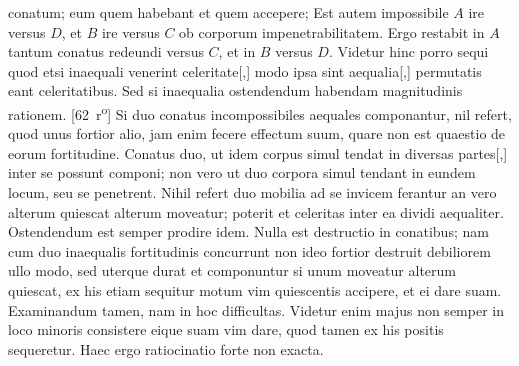  conatum;
eum quem habebant et quem accepere;
Est autem impossibile $\displaystyle A$ ire versus $\displaystyle D$,
et 
$\displaystyle B$ ire versus $\displaystyle C$ ob corporum impenetrabilitatem\protect{}. %
Ergo restabit in $\displaystyle A$ tantum conatus\protect{} redeundi versus $\displaystyle C$,
et in $\displaystyle B$ 
versus $\displaystyle D$.
Videtur hinc porro sequi quod etsi inaequali venerint celeritate\protect{}[,]
modo ipsa sint aequalia[,] permutatis eant celeritatibus.
Sed si inaequalia ostendendum habendam magnitudinis rationem.
[62~r\textsuperscript{o}]
\pend
\pstart
Si duo conatus incompossibiles\protect{} aequales componantur,
nil refert, quod unus fortior alio,
jam enim fecere effectum\protect{} suum,
quare non est quaestio de eorum fortitudine\protect{}.
Conatus\protect{} duo,
ut idem corpus simul tendat in diversas partes[,]
inter se possunt componi;
non vero ut duo corpora simul tendant in eundem locum,
seu se penetrent.
Nihil refert 
duo mobilia\protect{} ad se invicem ferantur
an vero alterum quiescat alterum moveatur;
poterit et celeritas\protect{} inter ea dividi aequaliter.
Ostendendum est semper prodire idem.
Nulla est destructio in conatibus\protect{};
nam cum duo inaequalis fortitudinis\protect{} concurrunt
non ideo fortior destruit debiliorem ullo modo,
sed uterque durat et componuntur si unum moveatur alterum quiescat,
ex his etiam sequitur motum vim quiescentis accipere, et ei dare suam.
Examinandum tamen, nam in hoc difficultas.
Videtur enim majus non semper in loco minoris consistere eique suam vim dare,
quod tamen ex his positis sequeretur.
Haec ergo ratiocinatio forte non exacta.
